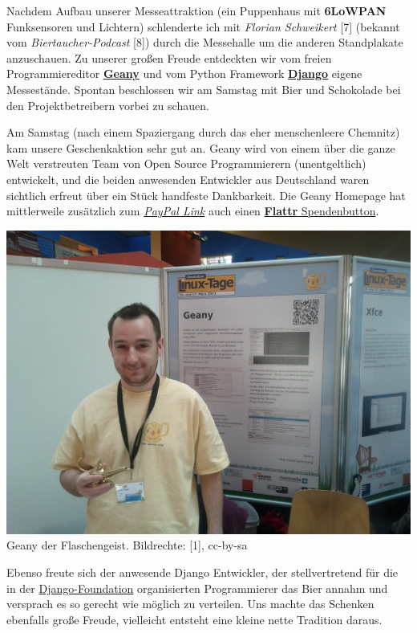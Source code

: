 \documentclass[10pt,a4paper,ngerman,twoside]{article} %
\begin{document}
\begin{multicols}{3}
Nachdem Aufbau unserer Messeattraktion (ein Puppenhaus mit \textbf{6LoWPAN} Funksensoren und Lichtern) schlenderte ich mit \textit{Florian Schweikert} [7] (bekannt vom \textit{Biertaucher-Podcast} [8]) durch die Messehalle um die anderen Standplakate anzuschauen. Zu unserer großen Freude entdeckten wir vom freien Programmiereditor \href{http://geany.org/}{\textbf{Geany}} und vom Python Framework \href{https://www.djangoproject.com/}{\textbf{Django}} eigene Messestände. Spontan beschlossen wir am Samstag mit Bier und Schokolade bei den Projektbetreibern vorbei zu schauen.

Am Samstag (nach einem Spaziergang durch das eher menschenleere Chemnitz) kam unsere Geschenkaktion sehr gut an. Geany wird von einem über die ganze Welt verstreuten Team von  Open Source Programmierern (unentgeltlich) entwickelt, und die beiden anwesenden Entwickler aus Deutschland waren sichtlich erfreut über ein Stück handfeste Dankbarkeit. Die Geany Homepage hat mittlerweile zusätzlich zum \href{https://www.paypal.com/cgi-bin/webscr?cmd=_s-xclick&hosted_button_id=8049199&lc=GB}{\textit{PayPal Link}} auch einen  \href{http://flattr.com/thing/1151425/Geany}{\textbf{Flattr} Spendenbutton}. 

\begin{center}
\includegraphics[width=\linewidth]{chemnitz/chemnitz_geany2.jpg}
\footnotesize{Geany der Flaschengeist. Bildrechte: [1], cc-by-sa}
\end{center}

Ebenso freute sich der anwesende Django Entwickler, der stellvertretend für die in der \href{https://www.djangoproject.com/foundation/}{Django-Foundation} organisierten  Programmierer das Bier annahm und versprach es so gerecht wie möglich zu verteilen. Uns machte das Schenken ebenfalls große Freude, vielleicht entsteht eine kleine nette Tradition daraus.


\end{multicols}
\end{document}
